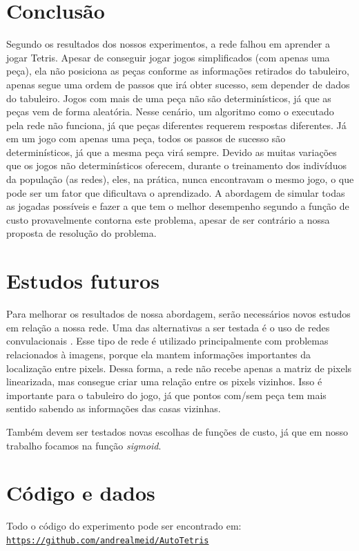 \documentclass[conference]{IEEEtran}
\begin{document}
\section{Conclusão}
Segundo os resultados dos nossos experimentos, a rede falhou em aprender a jogar Tetris. Apesar de conseguir jogar jogos simplificados (com apenas uma peça), ela não posiciona as peças conforme as informações retirados do tabuleiro, apenas segue uma ordem de passos que irá obter sucesso, sem depender de dados do tabuleiro. Jogos com mais de uma peça não são determinísticos, já que as peças vem de forma aleatória. Nesse cenário, um algoritmo como o executado pela rede não funciona, já que peças diferentes requerem respostas diferentes. Já em um jogo com apenas uma peça, todos os passos de sucesso são determinísticos, já que a mesma peça virá sempre. Devido as muitas variações que os jogos não determinísticos oferecem, durante o treinamento dos indivíduos da população (as redes), eles, na prática, nunca encontravam o mesmo jogo, o que pode ser um fator que dificultava o aprendizado. A abordagem de simular todas as jogadas possíveis e fazer a que tem o melhor desempenho segundo a função de custo provavelmente contorna este problema, apesar de ser contrário a nossa proposta de resolução do problema. 


\section{Estudos futuros}
Para melhorar os resultados de nossa abordagem, serão necessários novos estudos em relação a nossa rede. Uma das alternativas a ser testada é o uso de redes convulacionais \cite{b15}. Esse tipo de rede é utilizado principalmente com problemas relacionados à imagens, porque ela mantem informações importantes da localização entre pixels. Dessa forma, a rede não recebe apenas a matriz de pixels linearizada, mas consegue criar uma relação entre os pixels vizinhos. Isso é importante para o tabuleiro do jogo, já que pontos com/sem peça tem mais sentido sabendo as informações das casas vizinhas.

Também devem ser testados novas escolhas de funções de custo, já que em nosso trabalho focamos na função \textit{sigmoid}.

\section{Código e dados}
Todo o código do experimento pode ser encontrado em:\\
 \texttt{\url{https://github.com/andrealmeid/AutoTetris}}
\end{document}
